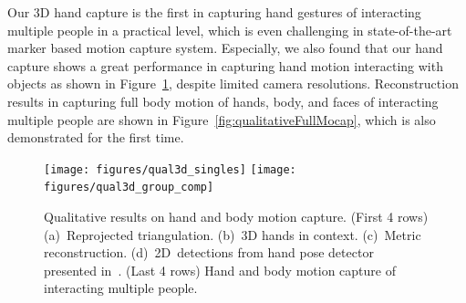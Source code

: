 Our 3D hand capture is the first in capturing hand gestures of interacting multiple people in a practical level, which is even challenging in state-of-the-art marker based motion capture system. Especially, we also found that our hand capture shows a great performance in capturing hand motion interacting with objects as shown in Figure~\ref{fig:qualitativeHandCaptureGroup}, despite limited camera resolutions.  Reconstruction results in capturing full body motion of hands, body, and faces of interacting multiple people are shown in Figure~\ref{fig:qualitativeFullMocap}, which is also demonstrated for the first time. 

\begin{figure}[h]
	\centering
	\texttt{[image: figures/qual3d\_singles]}
	\texttt{[image: figures/qual3d\_group\_comp]}
	\caption{Qualitative results on hand and body motion capture. (First 4 rows) (a)~Reprojected triangulation. (b)~3D hands in context. (c)~Metric reconstruction. (d)~2D~detections from hand pose detector presented in~\cite{simon2017hand}. (Last 4 rows) Hand and body motion capture of interacting multiple people.}
	\label{fig:qualitativeHandCaptureGroup}
\end{figure}
\vfill

